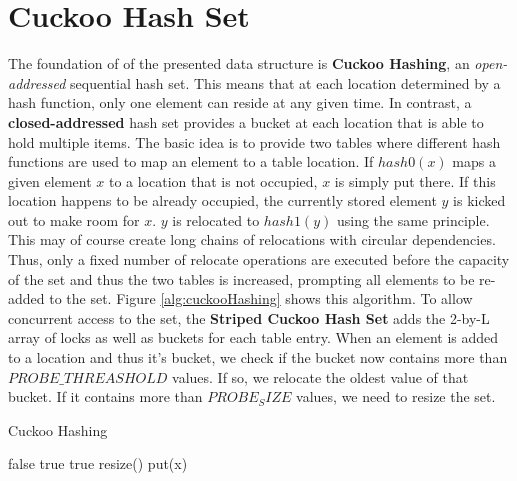 \documentclass[a4paper,10pt]{article}
\begin{document}
\section{Cuckoo Hash Set}
The foundation of of the presented data structure is \textbf{Cuckoo Hashing}, an \textit{open-addressed} sequential hash set. This means that at each location determined by a hash function, only one element can reside at any given time. In contrast, a \textbf{closed-addressed} hash set provides a bucket at each location that is able to hold multiple items.
\newline
The basic idea is to provide two tables where different hash functions are used to map an element to a table location. If $hash0(x)$ maps a given element $x$ to a location that is not occupied, $x$ is simply put there. If this location happens to be already occupied, the currently stored element $y$ is kicked out to make room for $x$. $y$ is relocated to $hash1(y)$ using the same principle. This may of course create long chains of relocations with circular dependencies. Thus, only a fixed number of relocate operations are executed before the capacity of the set and thus the two tables is increased, prompting all elements to be re-added to the set.
Figure \ref{alg:cuckooHashing} shows this algorithm.
\medskip
\newline
To allow concurrent access to the set, the \textbf{Striped Cuckoo Hash Set} adds the 2-by-L array of locks as well as buckets for each table entry. When an element is added to a location and thus it's bucket, we check if the bucket now contains more than $PROBE\_THREASHOLD$ values. If so, we relocate the oldest value of that bucket. If it contains more than $PROBE_SIZE$ values, we need to resize the set.

\begin{algorithm}
\caption{Cuckoo Hashing}
\label{alg:cuckooHashing}
\begin{algorithmic}[5]
		\State \Return false
	\EndIf
			\State \Return true
			\State \Return true
		\EndIf
	\EndFor
	\State resize()
	\State put(x)
\EndFunction
\end{algorithmic}
\end{algorithm}
\end{document}
